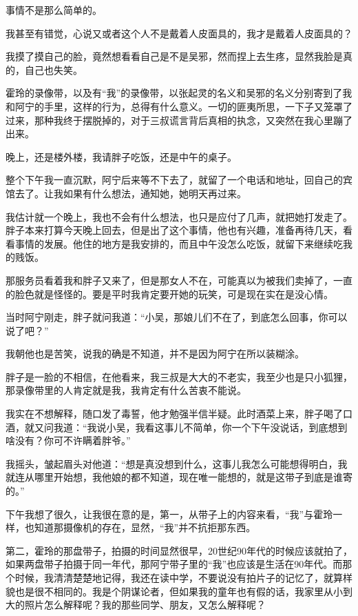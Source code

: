 事情不是那么简单的。

我甚至有错觉，心说又或者这个人不是戴着人皮面具的，我才是戴着人皮面具的？

我摸了摸自己的脸，竟然想看看自己是不是吴邪，然而捏上去生疼，显然我脸是真的，自己也失笑。

霍玲的录像带，以及有“我”的录像带，以张起灵的名义和吴邪的名义分别寄到了我和阿宁的手里，这样的行为，总得有什么意义。一切的匪夷所思，一下子又笼罩了过来，那种我终于摆脱掉的，对于三叔谎言背后真相的执念，又突然在我心里蹦了出来。

晚上，还是楼外楼，我请胖子吃饭，还是中午的桌子。

整个下午我一直沉默，阿宁后来等不下去了，就留了一个电话和地址，回自己的宾馆去了。让我如果有什么想法，通知她，她明天再过来。

我估计就一个晚上，我也不会有什么想法，也只是应付了几声，就把她打发走了。胖子本来打算今天晚上回去，但是出了这个事情，他也有兴趣，准备再待几天，看看事情的发展。他住的地方是我安排的，而且中午没怎么吃饭，就留下来继续吃我的贱饭。

那服务员看着我和胖子又来了，但是那女人不在，可能真以为被我们卖掉了，一直的脸色就是怪怪的。要是平时我肯定要开她的玩笑，可是现在实在是没心情。

当时阿宁刚走，胖子就问我道：“小吴，那娘儿们不在了，到底怎么回事，你可以说了吧？”

我朝他也是苦笑，说我的确是不知道，并不是因为阿宁在所以装糊涂。

胖子是一脸的不相信，在他看来，我三叔是大大的不老实，我至少也是只小狐狸，那录像带里的人肯定就是我，我肯定有什么苦衷不能说。

我实在不想解释，随口发了毒誓，他才勉强半信半疑。此时酒菜上来，胖子喝了口酒，就又问我道：“我说小吴，我看这事儿不简单，你一个下午没说话，到底想到啥没有？你可不许瞒着胖爷。”

我摇头，皱起眉头对他道：“想是真没想到什么，这事儿我怎么可能想得明白，我就连从哪里开始想，我他娘的都不知道，现在唯一能想的，就是这带子到底是谁寄的。”

下午我想了很久，让我很在意的是，第一，从带子上的内容来看，“我”与霍玲一样，也知道那摄像机的存在，显然，“我”并不抗拒那东西。

第二，霍玲的那盘带子，拍摄的时间显然很早，20世纪90年代的时候应该就拍了，如果两盘带子拍摄于同一年代，那阿宁带子里的“我”也应该是生活在90年代。而那个时候，我清清楚楚地记得，我还在读中学，不要说没有拍片子的记忆了，就算样貌也是很不相同的。我是个阴谋论者，但如果我的童年也有假的话，我家里从小到大的照片怎么解释呢？我的那些同学、朋友，又怎么解释呢？

